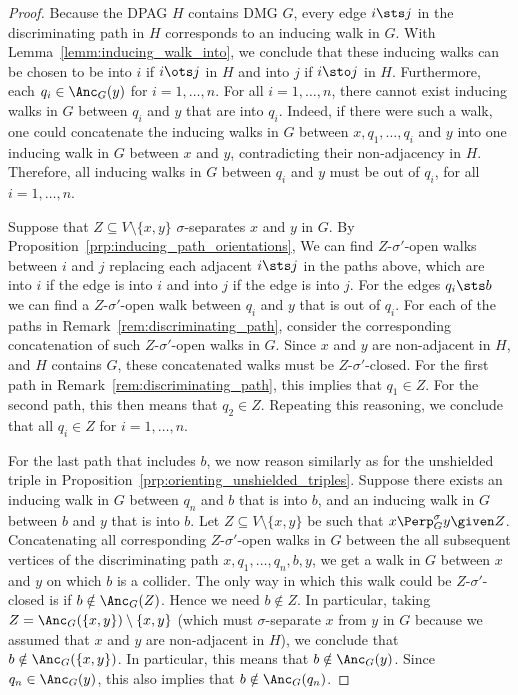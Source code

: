 \begin{proof}
  Because the DPAG $H$ contains DMG $G$, every edge $i \sts j$ in the discriminating path in $H$ corresponds to an inducing walk in $G$. %
  With Lemma~\ref{lemm:inducing_walk_into}, we conclude that these inducing walks can be chosen to be into $i$ if $i \ots j$ in $H$ and into $j$ if $i \sto j$ in $H$. 
  Furthermore, each $q_i \in \Anc_G(y)$ for $i = 1,\dots,n$. 
  For all $i=1,\dots,n$, there cannot exist inducing walks in $G$ between $q_i$ and $y$ that are into $q_i$.
  Indeed, if there were such a walk, one could concatenate the inducing walks in $G$ between $x, q_1, \dots, q_i$ and $y$ into one inducing walk in $G$ between $x$ and $y$, contradicting their non-adjacency in $H$.
  Therefore, all inducing walks in $G$ between $q_i$ and $y$ must be out of $q_i$, for all $i=1,\dots,n$.

  Suppose that $Z \subseteq V \setminus \{x,y\}$ $\sigma$-separates $x$ and $y$ in $G$. 
  By Proposition~\ref{prp:inducing_path_orientations},
  We can find $Z$-$\sigma'$-open walks between $i$ and $j$ replacing each adjacent $i \sts j$ in the paths above, which are into $i$ if the edge is into $i$ and into $j$ if the edge is into $j$.
  For the edges $q_i \sts b$ we can find a $Z$-$\sigma'$-open walk between $q_i$ and $y$ that is out of $q_i$.
  For each of the paths in Remark~\ref{rem:discriminating_path}, consider the corresponding concatenation of such $Z$-$\sigma'$-open walks in $G$.
  Since $x$ and $y$ are non-adjacent in $H$, and $H$ contains $G$, these concatenated walks must be $Z$-$\sigma'$-closed. 
  For the first path in Remark~\ref{rem:discriminating_path}, this implies that $q_1 \in Z$.
  For the second path, this then means that $q_2 \in Z$.
  Repeating this reasoning, we conclude that all $q_i \in Z$ for $i=1,\dots,n$.

  For the last path that includes $b$, we now reason similarly as for the unshielded triple in Proposition~\ref{prp:orienting_unshielded_triples}.
  Suppose there exists an inducing walk in $G$ between $q_n$ and $b$ that is into $b$, and an inducing walk in $G$ between $b$ and $y$ that is into $b$.
  Let $Z \subseteq V \setminus \{x,y\}$ be such that $x \Perp^\sigma_G y \given Z$.
  Concatenating all corresponding $Z$-$\sigma'$-open walks in $G$ between the all subsequent vertices of the discriminating path $x, q_1, \dots, q_n, b, y$, we get a walk in $G$ between $x$ and $y$ on which $b$ is a collider.
  The only way in which this walk could be $Z$-$\sigma'$-closed is if $b \notin \Anc_G(Z)$.
  Hence we need $b \notin Z$.
  In particular, taking $Z = \Anc_G(\{x,y\}) \setminus \{x,y\}$ (which must $\sigma$-separate $x$ from $y$ in $G$ because we assumed that $x$ and $y$ are non-adjacent in $H$), we conclude that $b \notin \Anc_G(\{x,y\})$. 
  In particular, this means that $b \notin \Anc_G(y)$.
  Since $q_n \in \Anc_G(y)$, this also implies that $b \notin \Anc_G(q_n)$. 


\end{proof}
